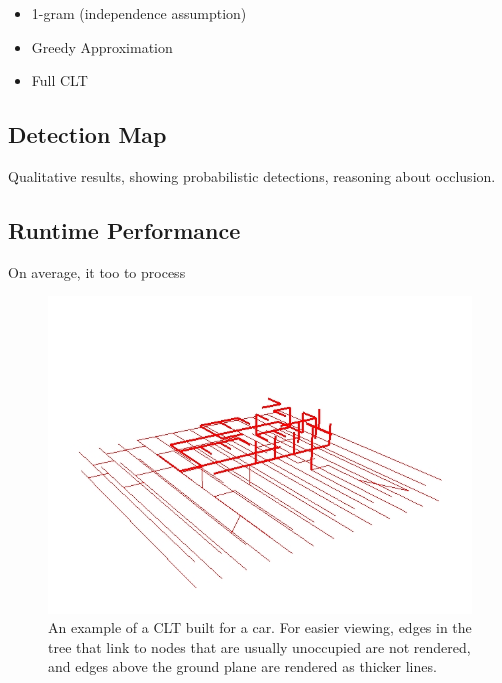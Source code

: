 \begin{itemize}
  \item 1-gram (independence assumption)
  \item Greedy Approximation
  \item Full \ac{CLT}
\end{itemize}

\subsection{Detection Map}

Qualitative results, showing probabilistic detections, reasoning about
occlusion.

\subsection{Runtime Performance}

On average, it too  to process 

\begin{figure}[!t]
  \includegraphics[width=\columnwidth]{figures/car_tree.jpg}
  \caption{An example of a \ac{CLT} built for a car. For easier viewing, edges
    in the tree that link to nodes that are usually unoccupied are not rendered,
    and edges above the ground plane are rendered as thicker lines.}
\end{figure}

\begin{figure}[!t]
\end{figure}

\begin{figure}[!t]
\end{figure}
